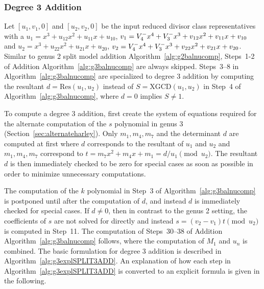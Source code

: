 \subsubsection{Degree 3 Addition}
Let $[u_1,v_1,0]$ and $[u_2,v_2,0]$ be the input reduced divisor class
representatives with a $u_1 = x^3 + u_{12}x^2 + u_{11}x + u_{10}$, $v_1 =
V^{-}_4x^4 + V^{-}_3x^3 + v_{12}x^2 + v_{11}x + v_{10}$ and $u_2 = x^3 + u_{22}x^2 +
u_{21}x + u_{20}$, $v_2 = V^{-}_4x^4 + V^{-}_3x^3 + v_{22}x^2 + v_{21}x + v_{20}$.
Similar to genus 2 split model addition Algorithm~\ref{alg:g2balnucomp},
Steps~1-2 of Addition Algorithm~\ref{alg:g3balnucomp} are always skipped.
Steps~3--8 in Algorithm~\ref{alg:g3balnucomp} are specialized to degree 3
addition by computing the resultant $d = \mathrm{Res}(u_1,u_2)$ instead of $S =
\mathrm{XGCD}(u_1,u_2)$ in Step~4 of Algorithm~\ref{alg:g3balnucomp}, where
$d=0$ implies $S \neq 1$. 

To compute a degree 3 addition, first create the system of equations required for the
alternate computation of the $s$ polynomial in genus 3
(Section~\ref{sec:alternateharley}).  Only $m_1,m_4,m_7$ and the determinant $d$ are
computed at first where $d$ corresponds to the resultant of $u_1$ and $u_2$
and $m_1,m_4,m_7$ correspond to $t = m_7x^2 + m_4x + m_1 = d/u_1
\pmod{u_2}$. The resultant $d$ is then immediately checked to be zero for
special cases as soon as possible in order to minimize unnecessary computations.

The computation of the $k$ polynomial in Step~3 of
Algorithm~\ref{alg:g3balnucomp} is postponed until after the computation of $d$,
and instead $d$ is immediately checked for special cases. If $d \neq 0$, then in
contrast to the genus 2 setting, the coefficients of $s$ are not solved for
directly and instead $s = (v_2 - v_1)t \pmod{u_2}$ is computed in Step~11. The
computation of Steps~30--38 of Addition Algorithm~\ref{alg:g3balnucomp} follows,
where  the computation of $M_1$ and $u_n$ is combined. The basic formulation for
degree 3 addition is described in Algorithm~\ref{alg:g3explSPLIT3ADD}. An
explanation of how each step in Algorithm~\ref{alg:g3explSPLIT3ADD} is converted
to an explicit formula is given in the following.


